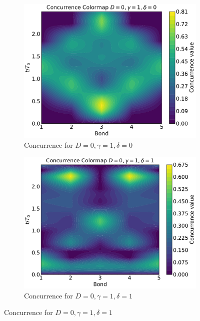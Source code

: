 \begin{figure}[h!]
    \centering
    \begin{subfigure}[b]{0.48\textwidth}
        \centering
        \includegraphics[width=\linewidth]{results_and_discussion/6_qubits/up_down_with_ana_0_1_0.pdf}
        \caption{Concurrence for \( D = 0, \gamma = 1, \delta = 0 \)}
        \label{fig:6q_0_1_0}
    \end{subfigure}
    \hfill
    \begin{subfigure}[b]{0.48\textwidth}
        \centering
        \includegraphics[width=\linewidth]{results_and_discussion/6_qubits/up_down_with_ana_0_1_1.pdf}
        \caption{Concurrence for \( D = 0, \gamma = 1, \delta = 1 \)}
        \label{fig:6q_0_1_1}
    \end{subfigure}


\end{figure}
